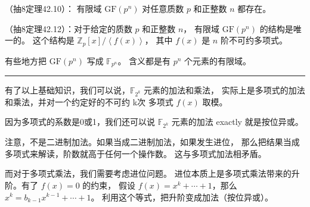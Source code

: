 （抽8定理42.10）：
有限域 $\mathrm{GF}(p^n)$ 对任意质数 $p$ 和正整数 $n$ 都存在。

（抽8定理42.12）：对于给定的质数 $p$ 和正整数 $n$，
有限域 $\mathrm{GF}(p^n)$ 的结构是唯一的。
这个结构是 $\mathbb{Z}_p[x]/\left<f(x)\right>$，
其中 $f(x)$ 是 $n$ 阶不可约多项式。

有些地方把 $\mathrm{GF}(p^n)$ 写成 $\mathbb{F}_{p^n}$。
含义都是有 $p^n$ 个元素的有限域。

\begin{center}\rule{0.5\linewidth}{0.5pt}\end{center}

有了以上基础知识，我们可以说，$\mathbb{F}_{2^k}$ 元素的加法和乘法，
实际上是多项式的加法和乘法，并对一个约定好的不可约 k次
多项式 $f(x)$ 取模。

因为多项式的系数是0或1，我们还可以说 $\mathbb{F}_{2^k}$ 元素的加法
exactly 就是按位异或。

注意，不是二进制加法。如果当成二进制加法，如果发生进位，
那么把结果当成多项式来解读，阶数就高于任何一个操作数。
这与多项式加法相矛盾。

而对于多项式乘法，我们需要考虑进位问题。
进位本质上是多项式乘法带来的升阶。有了 $f(x)=0$ 的约束，
假设 $f(x) = x^k + \cdots + 1$，那么 $x^k=b_{k-1}x^{k-1}+\cdots + 1$。
利用这个等式，把升阶变成加法（按位异或）。
